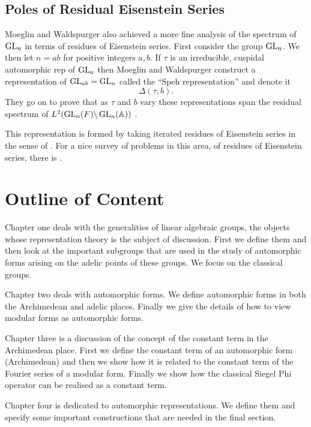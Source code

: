 \subsection{Poles of Residual Eisenstein Series}
Moeglin and Waldspurger also achieved a more fine analysis of the spectrum of \(\operatorname{GL}_n\) in terms of residues of Eisenstein series. 
First consider the group \(\operatorname{GL}_n\). We then let \(n = ab\) for positive integers \(a,b\). If \(\tau\) is an irreducible, cuspidal automorphic rep of \(\operatorname{GL}_a\) then Moeglin and Waldspurger construct a representation of \(\operatorname{GL}_{ab} = \operatorname{GL}_n\) called the ``Speh representation'' and denote it 
\[\Delta(\tau, b).\]
They go on to prove that as \(\tau\) and \(b\) vary these representations span the residual spectrum of \(L^2(\GL_n(F) \backslash \GL_n(\A))\) \cite[Thm. 1.1]{jiangPolesCertainResidual2013}.

This representation is formed by taking iterated residues of Eisenstein series in the sense of \cite[V]{moeglinSpectralDecompositionEisenstein1995}. For a nice survey of problems in this area, of residues of Eisenstein series, there is \cite{jiangResiduesEisensteinSeries2008a}.


\section*{Outline of Content}
Chapter one deals with the generalities of linear algebraic groups, the objects whose representation theory is the subject of discussion. First we define them and then look at the important subgroups that are used in the study of automorphic forms arising on the adelic points of these groups. We focus on the classical groups.

Chapter two deals with automorphic forms. We define automorphic forms in both the Archimedean and adelic places. Finally we give the details of how to view modular forms as automorphic forms. 

Chapter three is a discussion of the concept of the constant term in the Archimedean place. First we define the constant term of an automorphic form (Archimedean) and then we show how it is related to the constant term of the Fourier series of a modular form. Finally we show how the classical Siegel Phi operator can be realised as a constant term.

Chapter four is dedicated to automorphic representations. We define them and specify some important constructions that are needed in the final section.

